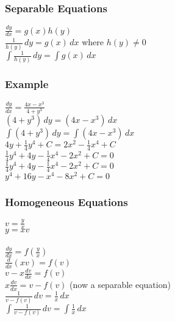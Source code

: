 \documentclass{article}
\begin{document}
		\subsubsection{Separable Equations}
				$\frac{dy}{dx} = g(x)h(y)$ \\
				$\frac{1}{h(y)} \,dy = g(x) \,dx$ \quad where $h(y) \ne 0$ \\
				$\int \frac{1}{h(y)} \,dy = \int g(x) \,dx$ \\
			
			\subsubsection*{Example}
				$\frac{dy}{dx} = \frac{4x - x^3}{4 + y^3}$ \\
				$(4 + y^3) \,dy = (4x - x^3) \,dx$ \\
				$\int (4 + y^3) \,dy = \int (4x - x^3) \,dx$ \\
				$4y + \frac{1}{4}y^4 + C = 2x^2 - \frac{1}{4}x^4 + C$ \\
				$\frac{1}{4} y^4 + 4y - \frac{1}{4}x^4 - 2x^2 + C = 0$ \\
				$\frac{1}{4} y^4 + 4y - \frac{1}{4}x^4 - 2x^2 + C = 0$ \\
				$y^4 + 16y - x^4 - 8x^2 + C = 0$ \\
	
			\subsubsection{Homogeneous Equations}
				$v = \frac{y}{x}$ \\
				$y = xv$ \\
				\\
				$\frac{dy}{dx} = f(\frac{y}{x})$ \\
				$\frac{d}{dx}(xv) = f(v)$ \\
				$v - x\frac{dv}{dx} = f(v)$ \\
				$x\frac{dv}{dx} = v - f(v)$ \quad (now a separable equation) \\
				$\frac{1}{v - f(v)} \,dv = \frac{1}{x} \,dx$ \\
				$\int \frac{1}{v - f(v)} \,dv = \int \frac{1}{x} \,dx$ \\
				
\end{document}
